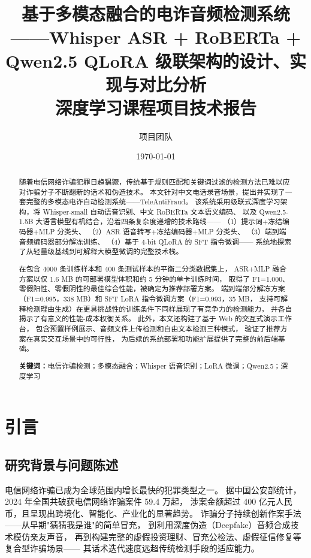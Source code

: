 \documentclass[11pt,a4paper]{ctexart}
\title{{\Large \textbf{基于多模态融合的电诈音频检测系统}}\\[0.3cm]
{\small ——Whisper ASR + RoBERTa + Qwen2.5 QLoRA 级联架构的设计、实现与对比分析}\\[0.8cm]
{\small 深度学习课程项目技术报告}}
\author{项目团队}
\date{\today}
\begin{document}
\maketitle\thispagestyle{empty}
\newpage\setcounter{page}{1}

\begin{abstract}
\noindent
随着电信网络诈骗犯罪日趋猖獗，传统基于规则匹配和关键词过滤的检测方法已难以应对诈骗分子不断翻新的话术和伪造技术。
本文针对中文电话录音场景，提出并实现了一套完整的多模态电诈自动检测系统——TeleAntiFraud。
该系统采用级联式深度学习架构，将 Whisper-small 自动语音识别、中文 RoBERTa 文本语义编码、
以及 Qwen2.5-1.5B 大语言模型有机结合，沿着四条复杂度递增的技术路线——
（1）提示词+冻结编码器+MLP 分类头、
（2）ASR 语音转写+冻结编码器+MLP 分类头、
（3）端到端音频编码器部分解冻训练、
（4）基于 4-bit QLoRA 的 SFT 指令微调——
系统地探索了从轻量级基线到可解释大模型微调的完整技术栈。

在包含 4000 条训练样本和 400 条测试样本的平衡二分类数据集上，
ASR+MLP 融合方案以仅 1.6 MB 的可部署模型体积和约 5 分钟的单卡训练时间，
取得了 F1=1.000、零假阳性、零假阴性的最佳综合性能，被确定为推荐部署方案。
端到端部分解冻方案（F1=0.995，338 MB）和 SFT LoRA 指令微调方案（F1=0.993，35 MB，
支持可解释检测理由生成）在更具挑战性的训练条件下同样展现了有竞争力的检测能力，
并各自揭示了有意义的性能-成本权衡关系。
此外，本文还构建了基于 Web 的交互式演示工作台，
包含预置样例展示、音频文件上传检测和自由文本检测三种模式，
验证了推荐方案在真实交互场景中的可行性，
为后续的系统部署和功能扩展提供了完整的前后端基础。

\vspace{0.5em}
\noindent\textbf{关键词：}电信诈骗检测；多模态融合；Whisper 语音识别；LoRA 微调；Qwen2.5；深度学习
\end{abstract}

\section{引言}

\subsection{研究背景与问题陈述}

电信网络诈骗已成为全球范围内增长最快的犯罪类型之一。
据中国公安部统计，2024 年全国共破获电信网络诈骗案件 59.4 万起，
涉案金额超过 400 亿元人民币，且呈现出跨境化、智能化、产业化的显著趋势\cite{fanzha2024}。
诈骗分子持续创新作案手法——从早期"猜猜我是谁"的简单冒充，
到利用深度伪造（Deepfake）音频合成技术模仿亲友声音，
再到构建完整的虚假投资理财、冒充公检法、虚假征信修复等复合型诈骗场景——
其话术迭代速度远超传统检测手段的适应能力。
\end{document}

